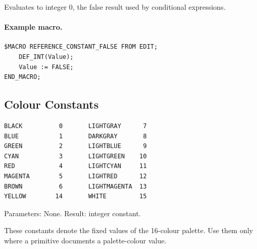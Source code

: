 \documentclass[a4paper,10pt,twoside,openany]{book}
\begin{document}
Evaluates to integer 0, the false result used by conditional expressions.

\paragraph{Example macro.}
\begin{verbatim}
$MACRO REFERENCE_CONSTANT_FALSE FROM EDIT;
    DEF_INT(Value);
    Value := FALSE;
END_MACRO;
\end{verbatim}

\subsection*{Colour Constants}
\label{prim:color-constants}
\label{prim:constant-black}
\label{prim:constant-blue}
\label{prim:constant-green}
\label{prim:constant-cyan}
\label{prim:constant-red}
\label{prim:constant-magenta}
\label{prim:constant-brown}
\label{prim:constant-lightgray}
\label{prim:constant-darkgray}
\label{prim:constant-lightblue}
\label{prim:constant-lightgreen}
\label{prim:constant-lightcyan}
\label{prim:constant-lightred}
\label{prim:constant-lightmagenta}
\label{prim:constant-yellow}
\label{prim:constant-white}
\begin{verbatim}
BLACK          0       LIGHTGRAY      7
BLUE           1       DARKGRAY       8
GREEN          2       LIGHTBLUE      9
CYAN           3       LIGHTGREEN    10
RED            4       LIGHTCYAN     11
MAGENTA        5       LIGHTRED      12
BROWN          6       LIGHTMAGENTA  13
YELLOW        14       WHITE         15
\end{verbatim}
Parameters: None. Result: integer constant.

These constants denote the fixed values of the 16-colour palette. Use them only where a primitive documents a palette-colour value.
\end{document}
